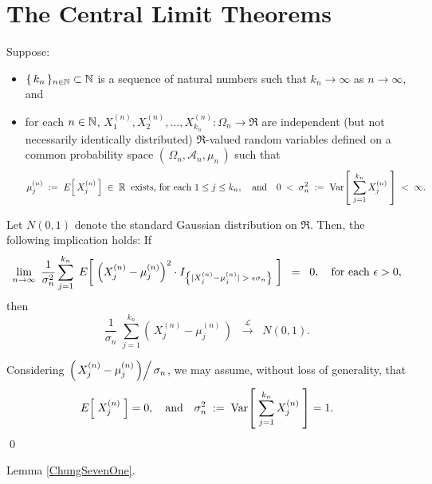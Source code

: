 

\section{The Central Limit Theorems}
\setcounter{theorem}{0}
\setcounter{equation}{0}

\renewcommand{\theenumi}{\alph{enumi}}
\renewcommand{\labelenumi}{\textnormal{(\theenumi)}$\;\;$}

\begin{theorem}
\mbox{}\vskip 0.2cm
\noindent
Suppose:
\begin{itemize}
\item	$\{\,k_{n}\,\}_{n\in\mathbb{N}}\subset\mathbb{N}$ is a sequence of natural numbers such that $k_{n} \rightarrow \infty$ as $n \rightarrow \infty$, and
\item	for each $n \in \mathbb{N}$, $X^{(n)}_{1}, X^{(n)}_{2}, \ldots, X^{(n)}_{k_{n}} : \Omega_{n} \longrightarrow \Re$
		are independent (but not necessarily identically distributed)
		$\Re$-valued random variables defined on a common probability space
		$\left(\,\Omega_{n},\mathcal{A}_{n},\mu_{n}\,\right)$ such that
		\begin{equation*}
		\mu^{(n)}_{j} \;:=\; E\!\left[\,X^{(n)}_{j}\,\right] \;\in\; \mathbb{R} \;\;\textnormal{exists, for each $1 \leq j \leq k_{n}$},
		\quad\textnormal{and}\quad
		0 \;<\; \sigma^{2}_{n} \;:=\; \textnormal{Var}\!\left[\;\overset{k_{n}}{\underset{j=1}{\sum}}\,X^{(n)}_{j}\;\right] \;<\; \infty.
		\end{equation*}
\end{itemize}
Let $N(0,1)$ denote the standard Gaussian distribution on $\Re$.
Then, the following implication holds:
If
\begin{equation*}
\lim_{n\rightarrow\infty}\;
\dfrac{1}{\sigma^{2}_{n}}
\sum_{j=1}^{k_{n}}\;
E\!\left[\;
\left(X^{(n)}_{j} - \mu^{(n)}_{j}\right)^{2}
\cdot
I_{\left\{\vert X^{(n)}_{j} - \mu^{(n)}_{j}\vert \;>\; \epsilon \sigma_{n}\right\}}
\;\right]
\;\;=\;\;
0,
\quad
\textnormal{for each $\epsilon > 0$},
\end{equation*}
then
\begin{equation*}
\dfrac{1}{\sigma_{n}}\;\sum^{k_{n}}_{j=1}\left(\,X^{(n)}_{j} - \mu^{(n)}_{j}\,\right)
\;\;\overset{\mathcal{L}}{\longrightarrow}\;\;
N(0,1).
\end{equation*}
\end{theorem}

\proof
Considering $\left.\left(\,X^{(n)}_{j} - \mu^{(n)}_{j}\,\right) \right/ \sigma_{n}$, we may assume, without loss of generality, that
\begin{equation*}
E\!\left[\;X^{(n)}_{j}\;\right] = 0,
\quad\textnormal{and}\quad
\sigma^{2}_{n}\;:=\;\textnormal{Var}\!\left[\;\sum^{k_{n}}_{j=1}X^{(n)}_{j}\;\right] = 1.
\end{equation*}
\qed

Lemma \ref{ChungSevenOne}.

